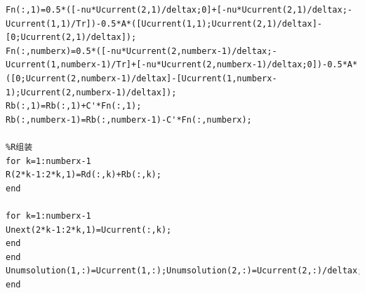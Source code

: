 \documentclass[a4paper,11pt,UTF8]{article}%
\theoremstyle{plain}
\begin{document}
\begin{lstlisting}
Fn(:,1)=0.5*([-nu*Ucurrent(2,1)/deltax;0]+[-nu*Ucurrent(2,1)/deltax;-Ucurrent(1,1)/Tr])-0.5*A*([Ucurrent(1,1);Ucurrent(2,1)/deltax]-[0;Ucurrent(2,1)/deltax]);
Fn(:,numberx)=0.5*([-nu*Ucurrent(2,numberx-1)/deltax;-Ucurrent(1,numberx-1)/Tr]+[-nu*Ucurrent(2,numberx-1)/deltax;0])-0.5*A*([0;Ucurrent(2,numberx-1)/deltax]-[Ucurrent(1,numberx-1);Ucurrent(2,numberx-1)/deltax]);
Rb(:,1)=Rb(:,1)+C'*Fn(:,1);
Rb(:,numberx-1)=Rb(:,numberx-1)-C'*Fn(:,numberx);

%R组装
for k=1:numberx-1
R(2*k-1:2*k,1)=Rd(:,k)+Rb(:,k);
end

for k=1:numberx-1
Unext(2*k-1:2*k,1)=Ucurrent(:,k);
end
end
Unumsolution(1,:)=Ucurrent(1,:);Unumsolution(2,:)=Ucurrent(2,:)/deltax;
end

\end{lstlisting}


	
\end{document}
